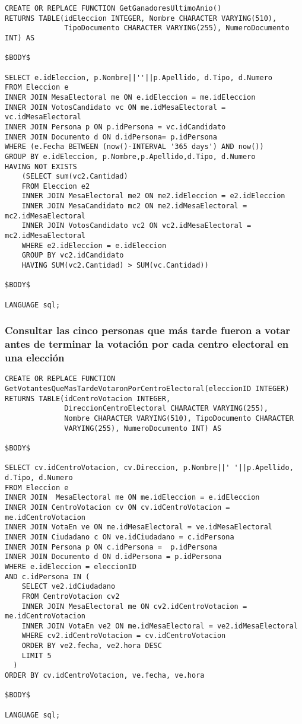 \begin{verbatim}
CREATE OR REPLACE FUNCTION GetGanadoresUltimoAnio()
RETURNS TABLE(idEleccion INTEGER, Nombre CHARACTER VARYING(510),
              TipoDocumento CHARACTER VARYING(255), NumeroDocumento INT) AS

$BODY$

SELECT e.idEleccion, p.Nombre||''||p.Apellido, d.Tipo, d.Numero
FROM Eleccion e
INNER JOIN MesaElectoral me ON e.idEleccion = me.idEleccion
INNER JOIN VotosCandidato vc ON me.idMesaElectoral = vc.idMesaElectoral
INNER JOIN Persona p ON p.idPersona = vc.idCandidato
INNER JOIN Documento d ON d.idPersona= p.idPersona
WHERE (e.Fecha BETWEEN (now()-INTERVAL '365 days') AND now())
GROUP BY e.idEleccion, p.Nombre,p.Apellido,d.Tipo, d.Numero
HAVING NOT EXISTS
    (SELECT sum(vc2.Cantidad)
    FROM Eleccion e2
    INNER JOIN MesaElectoral me2 ON me2.idEleccion = e2.idEleccion
    INNER JOIN MesaCandidato mc2 ON me2.idMesaElectoral = mc2.idMesaElectoral
    INNER JOIN VotosCandidato vc2 ON vc2.idMesaElectoral = mc2.idMesaElectoral
    WHERE e2.idEleccion = e.idEleccion
    GROUP BY vc2.idCandidato
    HAVING SUM(vc2.Cantidad) > SUM(vc.Cantidad))

$BODY$

LANGUAGE sql;

\end{verbatim}

\subsubsection{Consultar las cinco personas que más tarde fueron a votar antes de terminar la votación por cada centro electoral en una elección}

\begin{verbatim}
CREATE OR REPLACE FUNCTION GetVotantesQueMasTardeVotaronPorCentroElectoral(eleccionID INTEGER)
RETURNS TABLE(idCentroVotacion INTEGER,
              DireccionCentroElectoral CHARACTER VARYING(255),
              Nombre CHARACTER VARYING(510), TipoDocumento CHARACTER
              VARYING(255), NumeroDocumento INT) AS

$BODY$

SELECT cv.idCentroVotacion, cv.Direccion, p.Nombre||' '||p.Apellido, d.Tipo, d.Numero 
FROM Eleccion e
INNER JOIN  MesaElectoral me ON me.idEleccion = e.idEleccion
INNER JOIN CentroVotacion cv ON cv.idCentroVotacion = me.idCentroVotacion
INNER JOIN VotaEn ve ON me.idMesaElectoral = ve.idMesaElectoral
INNER JOIN Ciudadano c ON ve.idCiudadano = c.idPersona
INNER JOIN Persona p ON c.idPersona =  p.idPersona
INNER JOIN Documento d ON d.idPersona = p.idPersona
WHERE e.idEleccion = eleccionID
AND c.idPersona IN (
    SELECT ve2.idCiudadano
    FROM CentroVotacion cv2
    INNER JOIN MesaElectoral me ON cv2.idCentroVotacion = me.idCentroVotacion
    INNER JOIN VotaEn ve2 ON me.idMesaElectoral = ve2.idMesaElectoral
    WHERE cv2.idCentroVotacion = cv.idCentroVotacion
    ORDER BY ve2.fecha, ve2.hora DESC
    LIMIT 5
  )
ORDER BY cv.idCentroVotacion, ve.fecha, ve.hora

$BODY$

LANGUAGE sql;

\end{verbatim}


